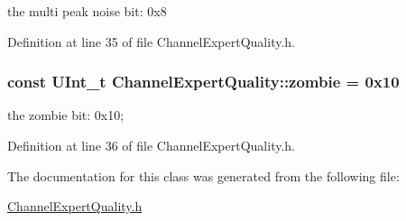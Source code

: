 the multi peak noise bit: 0x8 

Definition at line 35 of file ChannelExpertQuality.h.\hypertarget{class_channel_expert_quality_a260970cb0e2fe88bfc6cf741ca95b104}{
\subsubsection[{zombie}]{\setlength{\rightskip}{0pt plus 5cm}const UInt\_\-t {\bf ChannelExpertQuality::zombie} = 0x10}}
\label{class_channel_expert_quality_a260970cb0e2fe88bfc6cf741ca95b104}


the zombie bit: 0x10; 

Definition at line 36 of file ChannelExpertQuality.h.

The documentation for this class was generated from the following file:\begin{DoxyCompactItemize}
\item 
\hyperlink{_channel_expert_quality_8h}{ChannelExpertQuality.h}\end{DoxyCompactItemize}
